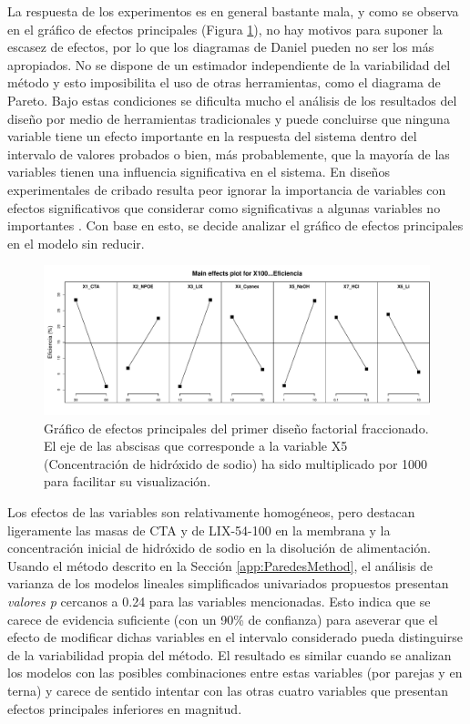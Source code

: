 La respuesta de los experimentos es en general bastante mala, y como se observa en el gráfico de efectos principales (Figura \ref{fig:FrF2-ME.1}), no hay motivos para suponer la escasez de efectos, por lo que los diagramas de Daniel pueden no ser los más apropiados. No se dispone de un estimador independiente de la variabilidad del método y esto imposibilita el uso de otras herramientas, como el diagrama de Pareto. Bajo estas condiciones se dificulta mucho el análisis de los resultados del diseño por medio de herramientas {tradicionales} y puede concluirse que ninguna variable tiene un efecto importante en la respuesta del sistema dentro del intervalo de valores probados o bien, más probablemente, que la mayoría de las variables tienen una influencia significativa en el sistema. En diseños experimentales de cribado resulta peor ignorar la importancia de variables con efectos significativos que considerar como significativas a algunas variables no importantes \citep{FrF2}. Con base en esto, se decide analizar el gráfico de efectos principales en el modelo sin reducir.

\begin{figure}[H]
    \includegraphics[width=\textwidth, trim = {0 1cm 0 1.34cm}, clip]{chap5/figures/MEP1.pdf}
    \caption[Gráfico de efectos principales del primer diseño factorial fraccionado.]{Gráfico de efectos principales del primer diseño factorial fraccionado. El eje de las abscisas que corresponde a la variable X5 (Concentración de hidróxido de sodio) ha sido multiplicado por 1000 para facilitar su visualización.}
    \label{fig:FrF2-ME.1}
\end{figure}

Los efectos de las variables son relativamente homogéneos, pero destacan ligeramente las masas de CTA y de LIX-54-100 en la membrana y la concentración inicial de hidróxido de sodio en la disolución de alimentación. Usando el método descrito en la Sección \ref{app:ParedesMethod}, el análisis de varianza de los modelos lineales simplificados univariados propuestos presentan \textit{valores p}  cercanos a 0.24 para las variables mencionadas. Esto indica que se carece de evidencia suficiente (con un 90\% de confianza) para aseverar que el efecto de modificar dichas variables en el intervalo considerado pueda distinguirse de la variabilidad propia del método. El resultado es similar cuando se analizan los modelos con las posibles combinaciones entre estas variables (por parejas y en terna) y carece de sentido intentar con las otras cuatro variables que presentan efectos principales inferiores en magnitud. 

